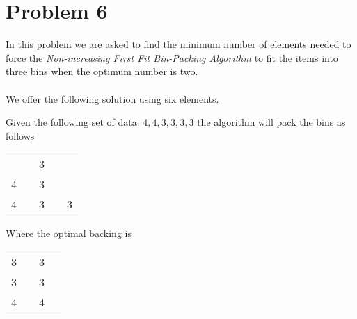 \section*{Problem 6}

In this problem we are asked to find the minimum number of elements needed to 
force the \textit{Non-increasing First Fit Bin-Packing Algorithm} to fit the
items into three bins when the optimum number is two.
\\
\\
We offer the following solution using six elements.

Given the following set of data: $4,4,3,3,3,3$ the algorithm will pack the 
bins as follows
\\
\begin{center}
\begin{tabular}{| c | c | c | c | c |}
          & & 3 & &    \\
        4 & & 3 & &    \\
        4 & & 3 & & 3  \\
\end{tabular}
\end{center}

Where the optimal backing is 

\begin{center}
\begin{tabular}{| c | c | c | c |}
        3 & & 3  \\
        3 & & 3  \\
        4 & & 4  \\
\end{tabular}
\end{center}
